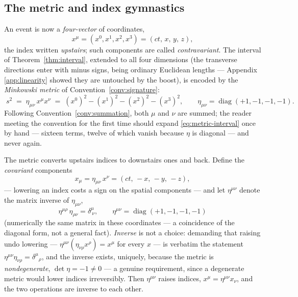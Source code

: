 \documentclass[11pt]{article}
\theoremstyle{plain}
\theoremstyle{definition}
\theoremstyle{remark}
\begin{document}
\subsection{The metric and index gymnastics}
\label{sec:index-gymnastics}

An event is now a \emph{four-vector} of coordinates,
\begin{equation}
  x^\mu = (x^0, x^1, x^2, x^3) = (ct,\, x,\, y,\, z),
\end{equation}
the index written \emph{upstairs}; such components are called
\emph{contravariant}. The interval of Theorem~\ref{thm:interval},
extended to all four dimensions (the transverse directions enter with
minus signs, being ordinary Euclidean lengths --- Appendix
\ref{app:linearity} showed they are untouched by the boost), is encoded
by the \emph{Minkowski metric} of Convention~\ref{conv:signature}:
\begin{equation}
  \boxed{\;
  s^2 \;=\; \eta_{\mu\nu}\, x^\mu x^\nu
  \;=\; (x^0)^2 - (x^1)^2 - (x^2)^2 - (x^3)^2,
  \qquad
  \eta_{\mu\nu} = \operatorname{diag}(+1, -1, -1, -1).
  \;}
  \label{eq:metric-interval}
\end{equation}
Following Convention~\ref{conv:summation}, both $\mu$ and $\nu$ are
summed; the reader meeting the convention for the first time should
expand \eqref{eq:metric-interval} once by hand --- sixteen terms, twelve
of which vanish because $\eta$ is diagonal --- and never again.

The metric converts upstairs indices to downstairs ones and back.
Define the \emph{covariant} components
\begin{equation}
  x_\mu = \eta_{\mu\nu}\, x^\nu = (ct,\, -x,\, -y,\, -z),
\end{equation}
--- lowering an index costs a sign on the spatial components --- and
let $\eta^{\mu\nu}$ denote the matrix inverse of $\eta_{\mu\nu}$,
\begin{equation}
  \eta^{\mu\rho}\,\eta_{\rho\nu} = \delta^\mu_{\ \nu},
  \qquad
  \eta^{\mu\nu} = \operatorname{diag}(+1, -1, -1, -1)
\end{equation}
(numerically the same matrix in these coordinates --- a coincidence of
the diagonal form, not a general fact). \emph{Inverse} is not a
choice: demanding that raising undo lowering ---
$\eta^{\mu\nu}(\eta_{\nu\rho}x^\rho) = x^\mu$ for every $x$ --- is
verbatim the statement $\eta^{\mu\nu}\eta_{\nu\rho} =
\delta^\mu{}_\rho$, and the inverse exists, uniquely, because the
metric is \emph{nondegenerate}, $\det\eta = -1 \neq 0$ --- a genuine
requirement, since a degenerate metric would lower indices
irreversibly. Then $\eta^{\mu\nu}$ raises
indices, $x^\mu = \eta^{\mu\nu} x_\nu$, and the two operations are
inverse to each other.
\end{document}
